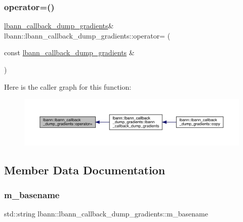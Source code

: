 \subsubsection{\texorpdfstring{operator=()}{operator=()}}
{\footnotesize\ttfamily \hyperlink{classlbann_1_1lbann__callback__dump__gradients}{lbann\+\_\+callback\+\_\+dump\+\_\+gradients}\& lbann\+::lbann\+\_\+callback\+\_\+dump\+\_\+gradients\+::operator= (\begin{DoxyParamCaption}\item[{const \hyperlink{classlbann_1_1lbann__callback__dump__gradients}{lbann\+\_\+callback\+\_\+dump\+\_\+gradients} \&}]{ }\end{DoxyParamCaption})\hspace{0.3cm}{\ttfamily [default]}}

Here is the caller graph for this function\+:\nopagebreak
\begin{figure}[H]
\begin{center}
\leavevmode
\includegraphics[width=350pt]{classlbann_1_1lbann__callback__dump__gradients_a31986866a3865159eb1680e5affba1f1_icgraph}
\end{center}
\end{figure}


\subsection{Member Data Documentation}
\mbox{\label{classlbann_1_1lbann__callback__dump__gradients_a5c8236660ca8b1cb61dddcd1264821ca}} 
\subsubsection{\texorpdfstring{m\+\_\+basename}{m\_basename}}
{\footnotesize\ttfamily std\+::string lbann\+::lbann\+\_\+callback\+\_\+dump\+\_\+gradients\+::m\+\_\+basename\hspace{0.3cm}{\ttfamily [private]}}

